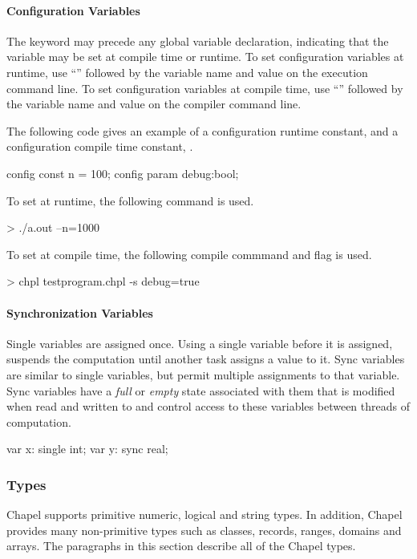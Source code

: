 \paragraph{Configuration Variables}
The keyword  may precede any global variable
declaration, indicating that the variable may be set at
compile time or runtime.
To set configuration variables at runtime, use ``\chpl{--}''
followed by the variable name and value on the execution
command line.
To set configuration variables at compile time, use
``'' followed by the variable name and value on the
compiler command line.

\begin{example}
The following code gives an example of a configuration
runtime constant,  and a configuration compile time constant,
.
\begin{chapel}
config const n = 100;
config param debug:bool;
\end{chapel}

To set  at runtime, the following command is used.
\begin{commandline}
> ./a.out --n=1000
\end{commandline}

To set  at compile time, the following compile commmand
and flag is used.
\begin{commandline}
> chpl testprogram.chpl -s debug=true
\end{commandline}
\end{example}

\paragraph{Synchronization Variables}
Single variables are assigned once.  Using a single variable
before it is assigned, suspends the computation until another
task assigns a value to it.
Sync variables are similar to single variables,
but permit multiple assignments to that variable. Sync
variables have a {\em full} or {\em empty} state associated
with them that is modified when read and written to and control
access to these variables between threads of computation.
\begin{chapel}
var x: single int;
var y: sync real;
\end{chapel}

\subsubsection{Types}
Chapel supports primitive numeric, logical and string types.  In
addition, Chapel provides many non-primitive types such as classes,
records, ranges, domains and arrays.  The paragraphs in this
section describe all of the Chapel types.

